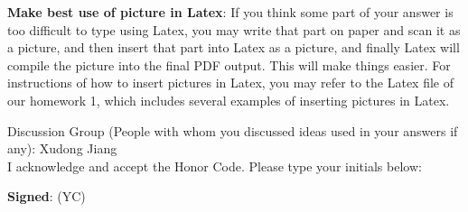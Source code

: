 \documentclass[12pt]{article}
\begin{document}
\textbf{Make best use of picture in Latex}: If you think some part of your answer is too difficult to type using Latex, you may write that part on paper and scan it as a picture, and then insert that part into Latex as a picture, and finally Latex will compile the picture into the final PDF output. This will make things easier. For instructions of how to insert pictures in Latex, you may refer to the Latex file of our homework 1, which includes several examples of inserting pictures in Latex.


\hrulefill

Discussion Group (People with whom you discussed ideas used in your answers if any): Xudong Jiang    \\[1ex]


I acknowledge and accept the Honor Code. Please type your initials below:

\textbf{Signed}: ({\color{blue}YC})

\hrulefill
\\
\\
\\
\\
\\


\end{document}
